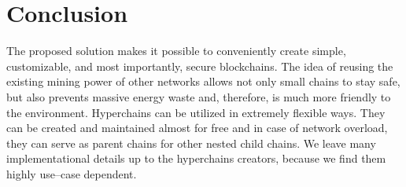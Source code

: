 \section{Conclusion}

The proposed solution makes it possible to conveniently create simple,
customizable, and most importantly, secure blockchains. The idea of reusing the
existing mining power of other networks allows not only small chains to stay
safe, but also prevents massive energy waste and, therefore, is much more
friendly to the environment. Hyperchains can be utilized in extremely flexible
ways. They can be created and maintained almost for free and in case of network
overload, they can serve as parent chains for other nested child chains. We
leave many implementational details up to the hyperchains creators, because we
find them highly use–case dependent.
